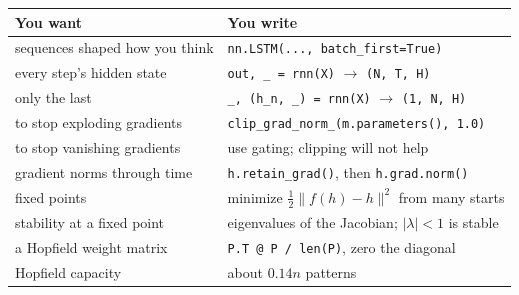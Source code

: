\documentclass[11pt]{article}
\begin{document}
\begin{center}
\begin{tabular}{@{}p{}p{}@{}}
\toprule
\textbf{You want} & \textbf{You write} \\
\midrule
sequences shaped how you think     & \texttt{nn.LSTM(..., batch\_first=True)} \\
every step's hidden state          & \texttt{out, \_ = rnn(X)} $\rightarrow$ \texttt{(N, T, H)} \\
only the last                      & \texttt{\_, (h\_n, \_) = rnn(X)} $\rightarrow$ \texttt{(1, N, H)} \\
to stop exploding gradients        & \texttt{clip\_grad\_norm\_(m.parameters(), 1.0)} \\
to stop vanishing gradients        & use gating; clipping will not help \\
gradient norms through time        & \texttt{h.retain\_grad()}, then \texttt{h.grad.norm()} \\
fixed points                       & minimize $\tfrac12\|f(h)-h\|^2$ from many starts \\
stability at a fixed point         & eigenvalues of the Jacobian; $|\lambda|<1$ is stable \\
a Hopfield weight matrix           & \texttt{P.T @ P / len(P)}, zero the diagonal \\
Hopfield capacity                  & about $0.14n$ patterns \\
\bottomrule
\end{tabular}
\end{center}
\end{document}
